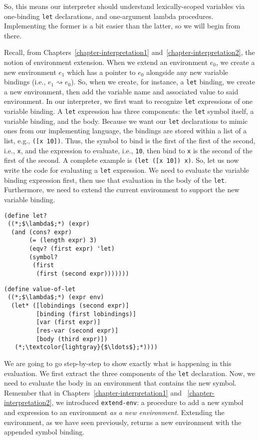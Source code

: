 So, this means our interpreter should understand lexically-scoped variables via one-binding \texttt{let} declarations, and one-argument lambda procedures. Implementing the former is a bit easier than the latter, so we will begin from there.

Recall, from Chapters~\ref{chapter-interpretation1} and~\ref{chapter-interpretation2}, the notion of environment extension. When we extend an environment $e_0$, we create a new environment $e_1$ which has a pointer to $e_0$ alongside any new variable bindings (i.e., $e_1\rightsquigarrow{e_0}$). So, when we create, for instance, a \texttt{let} binding, we create a new environment, then add the variable name and associated value to said environment. In our interpreter, we first want to recognize \texttt{let} expressions of one variable binding. A \texttt{let} expression has three components: the \texttt{let} symbol itself, a variable binding, and the body. Because we want our \texttt{let} declarations to mimic ones from our implementing language, the bindings are stored within a list of a list, e.g., \texttt{([x 10])}. Thus, the symbol to bind is the first of the first of the second, i.e., \texttt{x}, and the expression to evaluate, i.e., \texttt{10}, then bind to \texttt{x} is the second of the first of the second. A complete example is \texttt{(let ([x 10]) x)}. So, let us now write the code for evaluating a \texttt{let} expression. We need to evaluate the variable binding expression first, then use that evaluation in the body of the \texttt{let}. Furthermore, we need to extend the current environment to support the new variable binding.

\begin{clrr}[]{}
\begin{lstlisting}[language=MyScheme]
(define let?
 ((*;$\lambda$;*) (expr)
  (and (cons? expr)
       (= (length expr) 3)
       (eqv? (first expr) 'let)
       (symbol? 
        (first 
         (first (second expr)))))))
\end{lstlisting}
\tcblower
\begin{lstlisting}[language=MyNLNScheme]
(define value-of-let
 ((*;$\lambda$;*) (expr env)
  (let* ([lobindings (second expr)]
         [binding (first lobindings)]
         [var (first expr)]
         [res-var (second expr)]
         [body (third expr)])
   (*;\textcolor{lightgray}{$\ldots$};*))))
\end{lstlisting}
\end{clrr}

We are going to go step-by-step to show exactly what is happening in this evaluation. We first extract the three components of the \texttt{let} declaration. Now, we need to evaluate the body in an environment that contains the new symbol. Remember that in Chapters~\ref{chapter-interpretation1} and ~\ref{chapter-interpretation2}, we introduced \texttt{extend-env}: a procedure to add a new symbol and expression to an environment \textit{as a new environment}. Extending the environment, as we have seen previously, returns a new environment with the appended symbol binding. 

